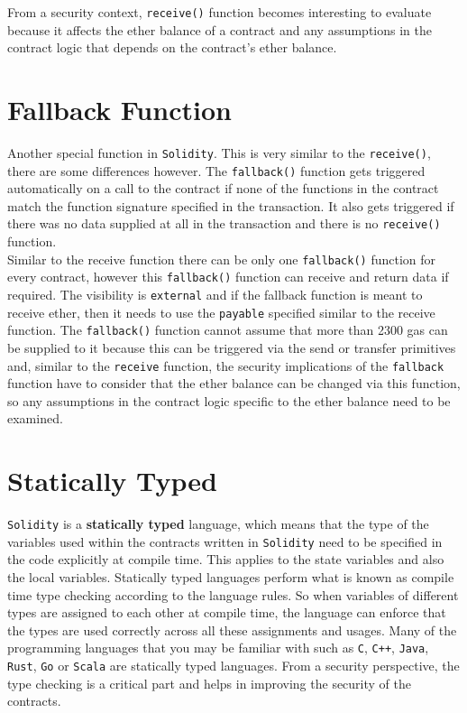 From a security context, \texttt{receive()} function becomes interesting to evaluate because it affects the ether balance of a contract and any assumptions in the contract logic that depends on the contract's ether balance.

\section{Fallback Function}
Another special function in \texttt{Solidity}. This is very similar to the \texttt{receive()}, there are some differences however. The \texttt{fallback()} function gets triggered automatically on a call to the contract if none of the functions in the contract match the function signature specified in the transaction. It also gets triggered if there was no data supplied at all in the transaction and there is no \texttt{receive()} function.\\

Similar to the receive function there can be only one \texttt{fallback()} function for every contract, however this \texttt{fallback()} function can receive and return data if required. The visibility is \texttt{external} and if the fallback function is meant to receive ether, then it needs to use the \texttt{payable} specified similar to the receive function. The \texttt{fallback()} function cannot assume that more than 2300 gas can be supplied to it because this can be triggered via the send or transfer primitives and, similar to the \texttt{receive} function, the security implications of the \texttt{fallback} function have to consider that the ether balance can be changed via this function, so any assumptions in the contract logic specific to the ether balance need to be examined.

\section{Statically Typed}
\texttt{Solidity} is a \textbf{statically typed} language, which means that the type of the variables used within the contracts written in \texttt{Solidity} need to be specified in the code explicitly at compile time. This applies to the state variables and also the local variables. Statically typed languages perform what is known as compile time type checking according to the language rules. So when variables of different types are assigned to each other at compile time, the language can enforce that the types are used correctly across all these assignments and usages. Many of the programming languages that you may be familiar with such as \texttt{C}, \texttt{C++}, \texttt{Java}, \texttt{Rust}, \texttt{Go} or \texttt{Scala} are statically typed languages. From a security perspective, the type checking is a critical part and helps in improving the security of the contracts.

